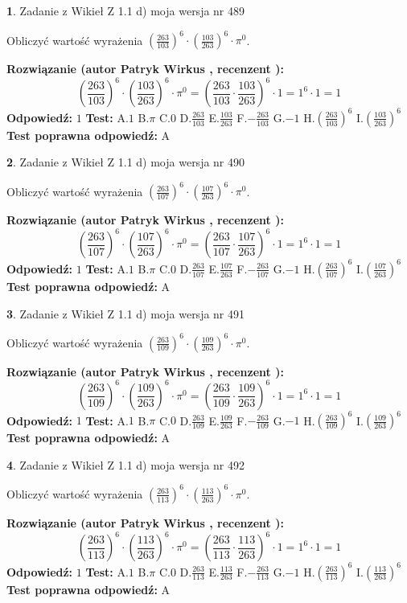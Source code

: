 \documentclass[12pt, a4paper]{article}
\theoremstyle{definition} %
\newtheorem{zad}{}
\newcommand{\zadStart}[1]{\begin{zad}#1\newline}
\newcommand{\zadStop}{\end{zad}}
\newcommand{\rozwStart}[2]{\noindent \textbf{Rozwiązanie (autor #1 , recenzent #2): }\newline}
\newcommand{\rozwStop}{\newline}
\newcommand{\odpStart}{\noindent \textbf{Odpowiedź:}\newline}
\newcommand{\odpStop}{\newline}
\newcommand{\testStart}{\noindent \textbf{Test:}\newline}
\newcommand{\testStop}{\newline}
\newcommand{\kluczStart}{\noindent \textbf{Test poprawna odpowiedź:}\newline}
\newcommand{\kluczStop}{\newline}
\begin{document}
\zadStart{Zadanie z Wikieł Z 1.1 d) moja wersja nr 489}

Obliczyć wartość wyrażenia $(\frac{263}{103})^{6} \cdot (\frac{103}{263})^{6} \cdot \pi^{0}$.
\zadStop
\rozwStart{Patryk Wirkus}{}
$$(\frac{263}{103})^{6} \cdot (\frac{103}{263})^{6} \cdot \pi^{0} = (\frac{263}{103} \cdot \frac{103}{263})^{6} \cdot 1 = 1^{6} \cdot 1 = 1$$
\rozwStop
\odpStart
$1$
\odpStop
\testStart
A.$1$ B.$\pi$ C.$0$ D.$\frac{263}{103}$ E.$\frac{103}{263}$
F.$-\frac{263}{103}$ G.$-1$
H.$(\frac{263}{103})^{6}$
I.$(\frac{103}{263})^{6}$
\testStop
\kluczStart
A
\kluczStop



\zadStart{Zadanie z Wikieł Z 1.1 d) moja wersja nr 490}

Obliczyć wartość wyrażenia $(\frac{263}{107})^{6} \cdot (\frac{107}{263})^{6} \cdot \pi^{0}$.
\zadStop
\rozwStart{Patryk Wirkus}{}
$$(\frac{263}{107})^{6} \cdot (\frac{107}{263})^{6} \cdot \pi^{0} = (\frac{263}{107} \cdot \frac{107}{263})^{6} \cdot 1 = 1^{6} \cdot 1 = 1$$
\rozwStop
\odpStart
$1$
\odpStop
\testStart
A.$1$ B.$\pi$ C.$0$ D.$\frac{263}{107}$ E.$\frac{107}{263}$
F.$-\frac{263}{107}$ G.$-1$
H.$(\frac{263}{107})^{6}$
I.$(\frac{107}{263})^{6}$
\testStop
\kluczStart
A
\kluczStop



\zadStart{Zadanie z Wikieł Z 1.1 d) moja wersja nr 491}

Obliczyć wartość wyrażenia $(\frac{263}{109})^{6} \cdot (\frac{109}{263})^{6} \cdot \pi^{0}$.
\zadStop
\rozwStart{Patryk Wirkus}{}
$$(\frac{263}{109})^{6} \cdot (\frac{109}{263})^{6} \cdot \pi^{0} = (\frac{263}{109} \cdot \frac{109}{263})^{6} \cdot 1 = 1^{6} \cdot 1 = 1$$
\rozwStop
\odpStart
$1$
\odpStop
\testStart
A.$1$ B.$\pi$ C.$0$ D.$\frac{263}{109}$ E.$\frac{109}{263}$
F.$-\frac{263}{109}$ G.$-1$
H.$(\frac{263}{109})^{6}$
I.$(\frac{109}{263})^{6}$
\testStop
\kluczStart
A
\kluczStop



\zadStart{Zadanie z Wikieł Z 1.1 d) moja wersja nr 492}

Obliczyć wartość wyrażenia $(\frac{263}{113})^{6} \cdot (\frac{113}{263})^{6} \cdot \pi^{0}$.
\zadStop
\rozwStart{Patryk Wirkus}{}
$$(\frac{263}{113})^{6} \cdot (\frac{113}{263})^{6} \cdot \pi^{0} = (\frac{263}{113} \cdot \frac{113}{263})^{6} \cdot 1 = 1^{6} \cdot 1 = 1$$
\rozwStop
\odpStart
$1$
\odpStop
\testStart
A.$1$ B.$\pi$ C.$0$ D.$\frac{263}{113}$ E.$\frac{113}{263}$
F.$-\frac{263}{113}$ G.$-1$
H.$(\frac{263}{113})^{6}$
I.$(\frac{113}{263})^{6}$
\testStop
\kluczStart
A
\kluczStop
\end{document}
